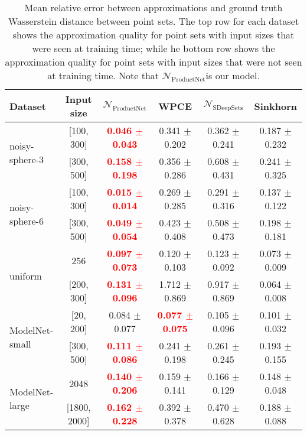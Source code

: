 \documentclass[12pt]{article}
\newcommand{\Network}{\mathcal{N}_{\mathrm{ProductNet}}}
\begin{document}
\begin{table}[t]
    \centering
    \caption{Mean relative error between approximations and ground truth Wasserstein distance between point sets. The top row for each dataset shows the approximation quality for point sets with input sizes that were seen at training time; while he bottom row shows the approximation quality for point sets with input sizes that were not seen at training time. Note that $\mathcal{N}_{\mathrm{ProductNet}}$is our model.}
    \small
    \begin{tabular}{lccccc}
          \toprule
          Dataset & Input size & $\Network$ & WPCE & $\mathcal{N}_{\mathrm{SDeepSets}}$ & Sinkhorn  \\
          \midrule
          \multirow{2}{*}{noisy-sphere-3} & [100, 300] & \textcolor{red}{\textbf{0.046 $\pm$ 0.043}} & 0.341 $\pm$ 0.202 & 0.362 $\pm$ 0.241 & 0.187 $\pm$ 0.232\\
         & [300, 500] & \textcolor{red}{\textbf{0.158 $\pm$ 0.198}} & 0.356 $\pm$ 0.286 & 0.608 $\pm$ 0.431 & 0.241 $\pm$ 0.325\\
         \midrule
         \multirow{2}{*}{noisy-sphere-6} & [100, 300] & \textcolor{red}{\textbf{0.015 $\pm$ 0.014}} & 0.269 $\pm$ 0.285 & 0.291 $\pm$ 0.316 & 0.137 $\pm$ 0.122\\
         & [300, 500] & \textcolor{red}{\textbf{0.049 $\pm$ 0.054}} & 0.423 $\pm$ 0.408 & 0.508 $\pm$ 0.473 & 0.198 $\pm$ 0.181\\
         \midrule
         \multirow{2}{*}{uniform} & 256 & \textcolor{red}{\textbf{0.097 $\pm$ 0.073}} & 0.120 $\pm$ 0.103 & 0.123 $\pm$ 0.092 & 0.073 $\pm$ 0.009\\
         & [200, 300] & \textcolor{red}{\textbf{0.131 $\pm$ 0.096}} & 1.712 $\pm$ 0.869 & 0.917 $\pm$ 0.869 & 0.064 $\pm$ 0.008\\
         \midrule
         \multirow{2}{*}{ModelNet-small} & [20, 200] & 0.084 $\pm$ 0.077 & \textcolor{red}{\textbf{0.077 $\pm$ 0.075}} & 0.105 $\pm$ 0.096 & 0.101 $\pm$ 0.032\\
         & [300, 500] & \textcolor{red}{\textbf{0.111 $\pm$ 0.086}} & 0.241 $\pm$ 0.198 & 0.261 $\pm$ 0.245 & 0.193 $\pm$ 0.155\\
         \midrule
         \multirow{2}{*}{ModelNet-large} & 2048 & \textcolor{red}{\textbf{0.140 $\pm$ 0.206}} & 0.159 $\pm$ 0.141 & 0.166 $\pm$ 0.129 & 0.148 $\pm$ 0.048\\
         & [1800, 2000] & \textcolor{red}{\textbf{0.162 $\pm$ 0.228}} &  0.392 $\pm$ 0.378 & 0.470 $\pm$ 0.628 & 0.188 $\pm$ 0.088\\

\end{tabular}
\end{table}
\end{document}
